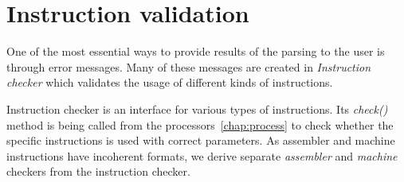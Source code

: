 \section{Instruction validation}

One of the most essential ways to provide results of the parsing to the user is through error messages. Many of these messages are created in \emph{Instruction checker} which validates the usage of different kinds of instructions.

Instruction checker is an interface for various types of instructions. Its \emph{check()} method is being called from the processors~\ref{chap:process} to check whether the specific instructions is used with correct parameters. As assembler and machine instructions have incoherent formats, we derive separate \emph{assembler} and \emph{machine} checkers from the instruction checker.